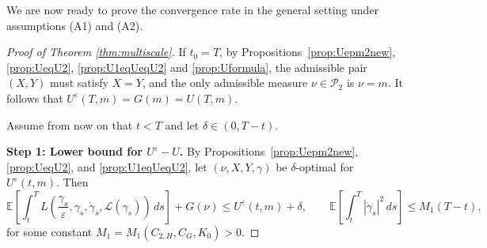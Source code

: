 \documentclass[reqno,11pt]{amsart}
\numberwithin{equation}{section}
\newcommand{\R}{\mathbb{R}} %
\newcommand{\e}{\varepsilon}
\newcommand{\ep}{\varepsilon}
\newcommand{\nd}{\noindent}
\begin{document}
We are now ready to prove the convergence rate in the general setting under assumptions (A1) and (A2).

\begin{proof}[Proof of Theorem \ref{thm:multiscale}]
If $t_0=T$, by Propositions~\ref{prop:Uepm2new}, \ref{prop:UeqU2}, \ref{prop:U1eqUeqU2} and \ref{prop:Uformula}, the admissible pair $(X, Y)$ must satisfy $X=Y$, and the only admissible measure $\nu \in \mathcal{P}_2$ is $\nu=m$. It follows that $U^\ep(T, m)=G(m)=U(T,m)$.


Assume from now on that $t<T$ and let $\delta \in \left(0, T- t\right)$.

\nd
\textbf{Step 1: Lower bound for $U^\ep-U$.} By Propositions~\ref{prop:Uepm2new}, \ref{prop:UeqU2}, and \ref{prop:U1eqUeqU2}, let $(\nu,X,Y,\gamma)$ be $\delta$-optimal for $U^\e(t,m)$. Then
\begin{equation}\label{eqn:nopuep}
 \mathbb{E}\left[\int_{t}^T L\left( \frac{\gamma_s}{\e}, \gamma_s, \dot{\gamma}_s, \mathcal{L}(\gamma_s) \right)\, ds \right] +G(\nu) \leq U^\e(t, m)+\delta, \qquad
\mathbb{E}\left[\int_{t}^T|\dot{\gamma}_s|^2 \,ds\right] \leq M_1(T-t),
\end{equation}
    for some constant $M_1=M_1(C_{2, H}, C_G, K_0)>0$.



\end{proof}
\end{document}

